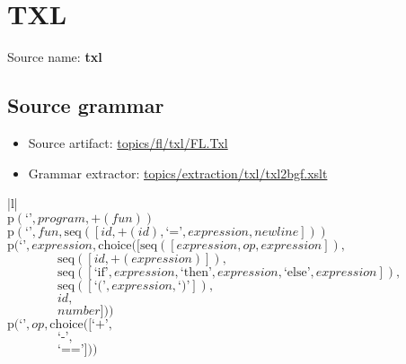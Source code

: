 \chapter{TXL}

 Source name: \textbf{txl}

\section{Source grammar}

\begin{itemize}\item Source artifact: \href{http://github.com/grammarware/slps/blob/master/topics/fl/txl/FL.Txl}{topics/fl/txl/FL.Txl}\item Grammar extractor: \href{http://github.com/grammarware/slps/blob/master/topics/extraction/txl/txl2bgf.xslt}{topics/extraction/txl/txl2bgf.xslt}\end{itemize}

\footnotesize\begin{center}\begin{tabular}{|l|}\hline
{}
\\\hline
$\mathrm{p}(\text{`'},\mathit{program},\plus \left(\mathit{fun}\right))$	\\
$\mathrm{p}(\text{`'},\mathit{fun},\mathrm{seq}\left(\left[\mathit{id}, \plus \left(\mathit{id}\right), \text{`='}, \mathit{expression}, \mathit{newline}\right]\right))$	\\
$\mathrm{p}(\text{`'},\mathit{expression},\mathrm{choice}([\mathrm{seq}\left(\left[\mathit{expression}, \mathit{op}, \mathit{expression}\right]\right),$\\$\qquad\qquad\mathrm{seq}\left(\left[\mathit{id}, \plus \left(\mathit{expression}\right)\right]\right),$\\$\qquad\qquad\mathrm{seq}\left(\left[\text{`if'}, \mathit{expression}, \text{`then'}, \mathit{expression}, \text{`else'}, \mathit{expression}\right]\right),$\\$\qquad\qquad\mathrm{seq}\left(\left[\text{`('}, \mathit{expression}, \text{`)'}\right]\right),$\\$\qquad\qquad\mathit{id},$\\$\qquad\qquad\mathit{number}]))$	\\
$\mathrm{p}(\text{`'},\mathit{op},\mathrm{choice}([\text{`+'},$\\$\qquad\qquad\text{`-'},$\\$\qquad\qquad\text{`=='}]))$	\\
\hline\end{tabular}\end{center}



